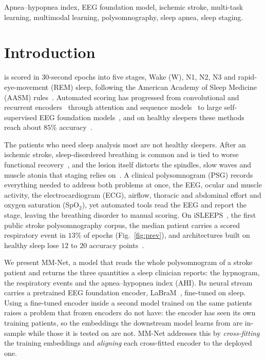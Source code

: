 \documentclass{ieeeaccess}
\begin{document}
\begin{keywords}
Apnea--hypopnea index, EEG foundation model, ischemic stroke, multi-task learning,
multimodal learning, polysomnography, sleep apnea, sleep staging.
\end{keywords}

\maketitle

\section{Introduction}
 is scored in 30-second epochs into five stages, Wake (W), N1, N2, N3 and
rapid-eye-movement (REM) sleep, following the American Academy of Sleep Medicine (AASM)
rules~\cite{aasm2023manual}. Automated scoring has progressed from convolutional and recurrent
encoders~\cite{supratak2017deepsleepnet,phan2019seqsleepnet,supratak2020tinysleepnet} through
attention and sequence models~\cite{eldele2021attnsleep,phan2021xsleepnet,perslev2019utime} to
large self-supervised EEG foundation
models~\cite{labram2024,cbramod2025,eegpt2024,biot2023}, and on healthy sleepers these methods
reach about $85\%$ accuracy~\cite{phan2022survey,yang2026review}.

The patients who need sleep analysis most are not healthy sleepers. After an ischemic stroke,
sleep-disordered breathing is common and is tied to worse functional
recovery~\cite{bassetti2006sleep,denis2024sleep}, and the lesion itself distorts the spindles,
slow waves and muscle atonia that staging relies
on~\cite{gottselig2002stroke,fernandez2019spindles,facchin2020slowwaves}. A clinical
polysomnogram (PSG) records everything needed to address both problems at once, the EEG,
ocular and muscle activity, the electrocardiogram (ECG), airflow, thoracic and abdominal effort
and oxygen saturation (SpO$_2$), yet automated tools read the EEG and report the stage, leaving
the breathing disorder to manual scoring. On iSLEEPS~\cite{maiti2026isleeps}, the first
public stroke polysomnography corpus, the median patient carries a scored respiratory event
in $13\%$ of epochs (Fig.~\ref{fig:prev}), and architectures built on healthy sleep lose
$12$ to $20$ accuracy points~\cite{bose2026gap}.

We present MM-Net, a model that reads the whole polysomnogram of a stroke patient and returns
the three quantities a sleep clinician reports: the hypnogram, the respiratory events and the
apnea--hypopnea index (AHI). Its neural stream carries a pretrained EEG foundation encoder,
LaBraM~\cite{labram2024}, fine-tuned on sleep. Using a fine-tuned encoder inside a second model
trained on the same patients raises a problem that frozen encoders do not have: the encoder has
seen its own training patients, so the embeddings the downstream model learns from are in-sample
while those it is tested on are not. MM-Net addresses this by \emph{cross-fitting} the training
embeddings and \emph{aligning} each cross-fitted encoder to the deployed one.
\end{document}
